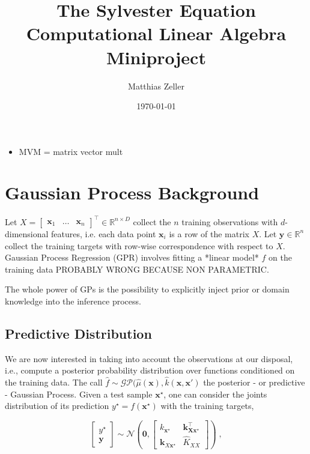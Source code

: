 \documentclass{article}
\title{
    {\huge \textbf{The Sylvester Equation}}\\
    Computational Linear Algebra Miniproject
}
\author{Matthias Zeller}
\date{\today}
\newcommand{\vect}[1]{\boldsymbol{\mathbf{#1}}}
\newcommand{\R}{\mathbb R}
\begin{document}
\maketitle

\begin{itemize}
    \item MVM = matrix vector mult
\end{itemize}

\section{Gaussian Process Background}

Let $X = \begin{bmatrix} \vect x_1 & \dots & \vect x_n \end{bmatrix}^\top \in \R^{n \times D}$ collect the $n$ training observations with $d$-dimensional features, i.e. each data point $\vect x_i$ is a row of the matrix $X$. Let $\vect y \in \R^n$ collect the training targets with row-wise correspondence with respect to $X$. Gaussian Process Regression (GPR) involves fitting a *linear model* $f$ on the training data PROBABLY WRONG BECAUSE NON PARAMETRIC. 

The whole power of GPs is the possibility to explicitly inject prior or domain knowledge into the inference process. 

\subsection{Predictive Distribution}

We are now interested in taking into account the observations at our disposal, i.e., compute a posterior probability distribution over functions conditioned on the training data. The call $\hat f \sim \mathcal{GP}(\hat \mu(\vect x), \hat k(\vect x, \vect x')$ the posterior - or predictive - Gaussian Process. Given a test sample $\vect x^\star$, one can consider the joints distribution of its prediction $y^\star = f(\vect x^\star)$ with the training targets,

\begin{equation*}
    \begin{bmatrix} y^\star \\ \vect y \end{bmatrix}
    \sim \mathcal N \left( \vect 0, \begin{bmatrix}
        k_{\vect x^\star} & \vect k_{\vect X \vect x^\star}^\top \\
        \vect k_{X \vect x^\star} & \widehat K_{XX}
    \end{bmatrix} \right) \; ,
\end{equation*}
\end{document}
